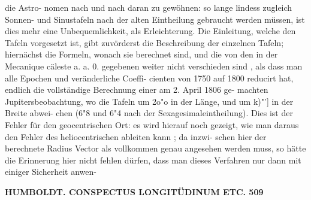 \documentclass[12pt,a4paper]{article}
\begin{document}
die  Astro- nomen nach  und  nach  daran  zu  gewöhnen:  so  lange  lindess  zugleich  Sonnen-  und  Sinustafeln  nach  der alten  Eintheilung  gebraucht  werden  müssen,  ist  dies  mehr  eine  Unbequemlichkeit,  als  Erleichterung. Die  Einleitung,  welche  den  Tafeln  vorgesetzt  ist,  gibt  zuvörderst  die  Beschreibung  der  einzelnen Tafeln;  hiernächst  die  Formeln,  wonach  sie  berechnet  sind,  und  die  von  den  in  der  Mecanique  cäleste a.  a.  0.  gegebenen  weiter  nicht  verschieden  sind ,  als  dass  man  alle  Epochen  und  veränderliche  Coeffi- cienten  von  1750  auf  1800  reducirt  hat,  endlich  die  vollständige  Berechnung  einer  am  2.  April  1806  ge- machten Jupitersbeobachtung,  wo  die  Tafeln  um  2o"o  in  der  Länge,  und  um  k)"']  in  der  Breite  abwei- chen (6"8  und  6"4  nach  der  Sexagesimaleintheilung).  Dies  ist  der  Fehler  für  den  geocentrischen  Ort: es  wird  hierauf  noch  gezeigt,  wie  man  daraus  den  Fehler  des  heliocentrischen  ableiten  kann ;  da  inzwi- schen hier  der  berechnete  Radius  Vector  als  vollkommen  genau  angesehen  werden  muss,  so  hätte  die Erinnerung  hier  nicht  fehlen  dürfen,  dass  man  dieses  Verfahren  nur  dann  mit  einiger  Sicherheit  anwen-

\vspace{0.5em}


\noindent\textbf{HUMBOLDT.     CONSPECTUS  LONGITÜDINUM  ETC.  509}
\end{document}

